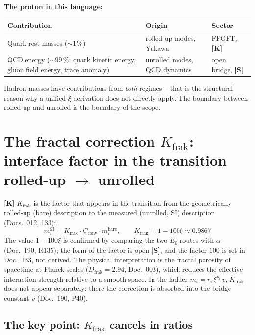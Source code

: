 \textbf{The proton in this language:}
\begin{center}
\begin{tabular}{lll}
\toprule
Contribution & Origin & Sector \\
\midrule
Quark rest masses ($\sim 1\,\%$) & rolled-up modes, Yukawa
  & FFGFT, \textbf{[K]} \\
QCD energy ($\sim 99\,\%$: quark kinetic energy, gluon field energy, trace anomaly) & unrolled modes, QCD dynamics
  & open bridge, \textbf{[S]} \\
\bottomrule
\end{tabular}
\end{center}

Hadron masses have contributions from \emph{both} regimes -- that is the
structural reason why a unified $\xi$-derivation does not directly apply.
The boundary between rolled-up and unrolled is the boundary of the scope.

\section{The fractal correction $K_{\text{frak}}$: interface factor in the transition rolled-up $\to$ unrolled}

\textbf{[K]} $K_{\text{frak}}$ is the factor that appears in the
transition from the geometrically rolled-up (bare) description to the
measured (unrolled, SI) description (Docs.~012, 133):
\begin{equation}
  m_i^{\text{SI}} = K_{\text{frak}} \cdot C_{\text{conv}} \cdot m_i^{\text{bare}},
  \qquad K_{\text{frak}} = 1 - 100\xi \approx 0.9867
\end{equation}
The value $1 - 100\xi$ is confirmed by comparing the two $E_0$ routes
with $\alpha$ (Doc.~190, R135); the form of the factor is open
\textbf{[S]}, and the factor $100$ is set in Doc.~133, not derived.
The physical interpretation is the fractal porosity of spacetime at
Planck scales ($D_{\text{frak}} = 2.94$, Doc.~003), which reduces the
effective interaction strength relative to a smooth space.
In the ladder $m_i = r_i\,\xi^{p_i}\,v$, $K_{\text{frak}}$ does not
appear separately: there the correction is absorbed into the bridge
constant $v$ (Doc.~190, P40).

\subsection{The key point: $K_{\text{frak}}$ cancels in ratios}

